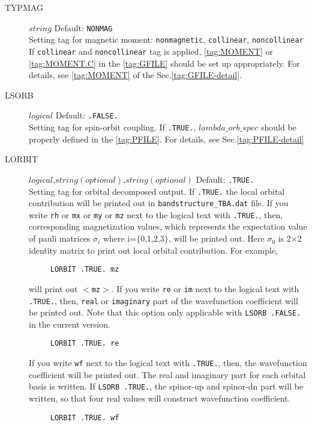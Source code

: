 \documentclass[a4paper,12pt]{scrartcl}
\makeatletter
\def\namedlabel#1#2{\begingroup
    #2%
    \def\@currentlabel{#2}%
    \phantomsection\label{#1}\endgroup
}
\makeatother
\begin{document}
\begin{description}
    \item[\namedlabel{tag:TYPMAG}{TYPMAG}] $string$ Default: \texttt{NONMAG} \\
        Setting tag for magnetic moment: \texttt{nonmagnetic}, \texttt{collinear}, 
		\texttt{noncollinear}
		If \texttt{collinear} and \texttt{noncollinear} tag is applied, 
		\ref{tag:MOMENT} or \ref{tag:MOMENT.C} in the \ref{tag:GFILE}
		should be set up appropriately.
		For details, see \ref{tag:MOMENT} of the Sec.\ref{tag:GFILE-detail}.

    \item[\namedlabel{tag:LSORB}{LSORB}] $logical$ Default: \texttt{.FALSE.} \\
        Setting tag for spin-orbit coupling. 
		If \texttt{.TRUE.}, $lambda\_orb\_spec$ should be properly defined in the
		\ref{tag:PFILE}. For details, see Sec.\ref{tag:PFILE-detail}

    \item[\namedlabel{tag:LORBIT}{LORBIT}] $logical$,$string (optional)$,$string (optional)$ Default: \texttt{.TRUE.} \\
        Setting tag for orbital decomposed output.
		If \texttt{.TRUE.} the local orbital contribution will be printed out
		in \texttt{bandstructure\_TBA.dat} file.
        If you write \texttt{rh} or \texttt{mx} or \texttt{my} or \texttt{mz} next to the logical text with \texttt{.TRUE.},
        then, corresponding magnetization values, which represents
        the expectation value of pauli matrices $\sigma_{i}$ where i=$\{$0,1,2,3$\}$, 
        will be printed out. Here $\sigma_{0}$ is 2$\times$2 identity 
        matrix to print out local orbital contribution. For example,   
        
    \begin{verbatim}
     LORBIT .TRUE. mz
    \end{verbatim}
    will print out $<$\texttt{mz}$>$.
        If you write \texttt{re} or \texttt{im} next to the logical text with \texttt{.TRUE.}, then, \texttt{real} or \texttt{imaginary} part of the wavefunction coefficient will be printed out. Note that this option only applicable with \texttt{LSORB .FALSE.} in the current version.
    \begin{verbatim}
     LORBIT .TRUE. re
    \end{verbatim}
        If you write \texttt{wf} next to the logical text with \texttt{.TRUE.}, then, the wavefunction coefficient will be printed out. The real and imaginary part for 
        each orbital basis is written. If \texttt{LSORB .TRUE.},
        the spinor-up and spinor-dn part will be written, so that four real values will construct wavefunction coefficient. 
    \begin{verbatim}
     LORBIT .TRUE. wf
    \end{verbatim}


\end{description}
\end{document}
